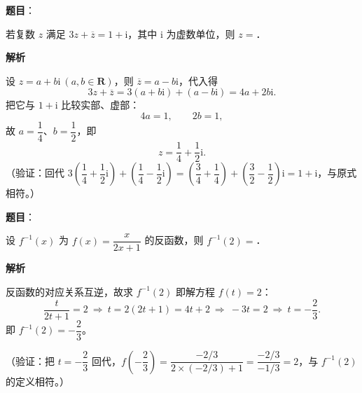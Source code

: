 \begin{answer}

\textbf{题目}：

若复数 \(z\) 满足 \(3z+\overline{z}=1+\mathrm{i}\)，其中 \(\mathrm{i}\) 为虚数单位，则 \(z=\)\gkblank{}．

\textbf{解析}

设 \(z=a+b\mathrm{i}\ (a,b\in\mathbf{R})\)，则 \(\overline{z}=a-b\mathrm{i}\)，代入得
\nopagebreak[4]
\[
3z+\overline{z}=3(a+b\mathrm{i})+(a-b\mathrm{i})=4a+2b\mathrm{i}.
\]
把它与 \(1+\mathrm{i}\) 比较实部、虚部：
\nopagebreak[4]
\[
4a=1,\qquad 2b=1,
\]
故 \(a=\dfrac{1}{4}\)、\(b=\dfrac{1}{2}\)，即
\nopagebreak[4]
\[
z=\frac{1}{4}+\frac{1}{2}\mathrm{i}.
\]
（验证：回代 \(3\left(\dfrac{1}{4}+\dfrac{1}{2}\mathrm{i}\right)+\left(\dfrac{1}{4}-\dfrac{1}{2}\mathrm{i}\right)=\left(\dfrac{3}{4}+\dfrac{1}{4}\right)+\left(\dfrac{3}{2}-\dfrac{1}{2}\right)\mathrm{i}=1+\mathrm{i}\)，与原式相符。）


\end{answer}
\begin{answer}

\textbf{题目}：

设 \(f^{-1}(x)\) 为 \(f(x)=\dfrac{x}{2x+1}\) 的反函数，则 \(f^{-1}(2)=\)\gkblank{}．

\textbf{解析}

反函数的对应关系互逆，故求 \(f^{-1}(2)\) 即解方程 \(f(t)=2\)：
\nopagebreak[4]
\[
\frac{t}{2t+1}=2\ \Longrightarrow\ t=2(2t+1)=4t+2\ \Longrightarrow\ -3t=2\ \Longrightarrow\ t=-\frac{2}{3}.
\]
即 \(f^{-1}(2)=-\dfrac{2}{3}\)。

（验证：把 \(t=-\dfrac{2}{3}\) 回代，\(f\left(-\dfrac{2}{3}\right)=\dfrac{-2/3}{2\times(-2/3)+1}=\dfrac{-2/3}{-1/3}=2\)，与 \(f^{-1}(2)\) 的定义相符。）


\end{answer}
